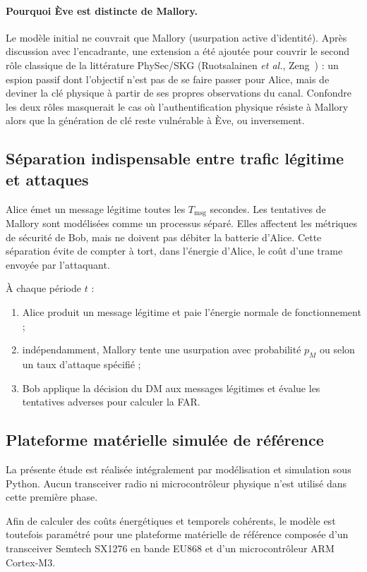 \documentclass[conference,a4paper]{IEEEtran}
\begin{document}
\paragraph{Pourquoi Ève est distincte de Mallory.}
Le modèle initial ne couvrait que Mallory (usurpation active d'identité). Après discussion avec l'encadrante, une extension a été ajoutée pour couvrir le second rôle classique de la littérature PhySec/SKG (Ruotsalainen \emph{et al.}, Zeng~\cite{zeng2015}) : un espion passif dont l'objectif n'est pas de se faire passer pour Alice, mais de deviner la clé physique à partir de ses propres observations du canal. Confondre les deux rôles masquerait le cas où l'authentification physique résiste à Mallory alors que la génération de clé reste vulnérable à Ève, ou inversement.

\subsection{Séparation indispensable entre trafic légitime et attaques}
Alice émet un message légitime toutes les $T_{\mathrm{msg}}$ secondes. Les tentatives de Mallory sont modélisées comme un processus séparé. Elles affectent les métriques de sécurité de Bob, mais ne doivent pas débiter la batterie d'Alice. Cette séparation évite de compter à tort, dans l'énergie d'Alice, le coût d'une trame envoyée par l'attaquant.

À chaque période $t$ :
\begin{enumerate}
    \item Alice produit un message légitime et paie l'énergie normale de fonctionnement ;
    \item indépendamment, Mallory tente une usurpation avec probabilité $p_M$ ou selon un taux d'attaque spécifié ;
    \item Bob applique la décision du DM aux messages légitimes et évalue les tentatives adverses pour calculer la FAR.
\end{enumerate}

\subsection{Plateforme matérielle simulée de référence}

La présente étude est réalisée intégralement par modélisation et
simulation sous Python. Aucun transceiver radio ni microcontrôleur
physique n'est utilisé dans cette première phase.

Afin de calculer des coûts énergétiques et temporels cohérents, le
modèle est toutefois paramétré pour une plateforme matérielle de
référence composée d'un transceiver Semtech SX1276 en bande EU868
et d'un microcontrôleur ARM Cortex-M3.
\end{document}
